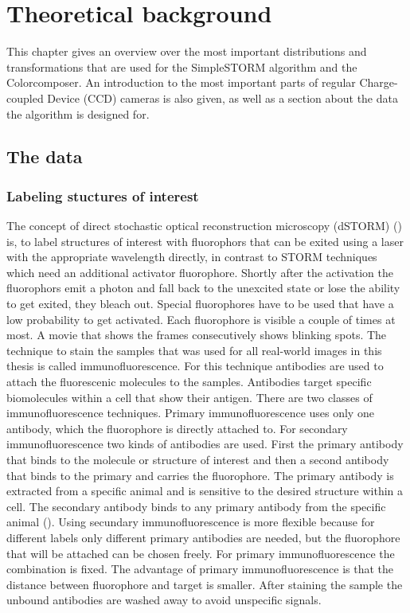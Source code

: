 \chapter{Theoretical background}
This chapter gives an overview over the most important distributions and transformations that are used for the SimpleSTORM algorithm and the Colorcomposer. An introduction to the most important parts of regular Charge-coupled Device (CCD) cameras is also given, as well as a section about the data the algorithm is designed for. 

\section{The data}
\subsection{Labeling stuctures of interest}
The concept of direct stochastic optical reconstruction microscopy (dSTORM) (\cite{heilemann}) is, to label structures of interest with fluorophors that can be exited using a laser with the appropriate wavelength directly, in contrast to STORM techniques which need an additional activator fluorophore. Shortly after the activation the fluorophors emit a photon and fall back to the unexcited state or lose the ability to get exited, they bleach out. Special fluorophores have to be used that have a low probability to get activated. Each fluorophore is visible a couple of times at most. A movie that shows the frames consecutively shows blinking spots.\newline
The technique to stain the samples that was used for all real-world images in this thesis is called immunofluorescence. For this technique antibodies are used to attach the fluorescenic molecules to the samples. Antibodies target specific biomolecules within a cell that show their antigen. There are two classes of immunofluorescence techniques.\newline
Primary immunofluorescence uses only one antibody, which the fluorophore is directly attached to.\newline
For secondary immunofluorescence two kinds of antibodies are used. First the primary antibody that binds to the molecule or structure of interest and then a second antibody that binds to the primary and carries the fluorophore. The primary antibody is extracted from a specific animal and is sensitive to the desired structure within a cell. The secondary antibody binds to any primary antibody from the specific animal (\cite{immuno}).\newline
Using secundary immunofluorescence is more flexible because for different labels only different primary antibodies are needed, but the fluorophore that will be attached can be chosen freely. For primary immunofluorescence the combination is fixed.\newline
The advantage of primary immunofluorescence is that the distance between fluorophore and target is smaller.\newline
After staining the sample the unbound antibodies are washed away to avoid unspecific signals.

